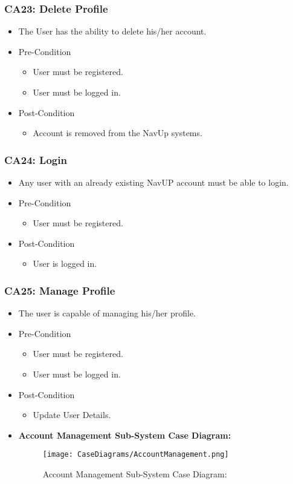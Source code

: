 \documentclass[12pt,a4paper]{article}
\begin{document}
		\subsubsection{CA23: Delete Profile}
			\begin{itemize}
				\item The User has the ability to delete his/her account.
					\item Pre-Condition
						\begin{itemize}
							\item User must be registered.
							\item User must be logged in.
						\end{itemize}
					\item Post-Condition
						\begin{itemize}
							\item Account is removed from the NavUp systems.
						\end{itemize}
			\end{itemize}
		\subsubsection{CA24: Login}
			\begin{itemize}
				\item Any user with an already existing NavUP account must be able to login.
					\item Pre-Condition
						\begin{itemize}
							\item User must be registered.
						\end{itemize}
					\item Post-Condition
						\begin{itemize}
							\item User is logged in.
						\end{itemize}
			\end{itemize}
		\subsubsection{CA25: Manage Profile}
			\begin{itemize}
				\item The user is capable of managing his/her profile.
					\item Pre-Condition
						\begin{itemize}
							\item User must be registered.
							\item User must be logged in.
						\end{itemize}
					\item Post-Condition
						\begin{itemize}
							\item Update User Details.
						\end{itemize}
				\item \textbf{Account Management Sub-System Case Diagram:}
				\begin{figure}[H]
					\texttt{[image: CaseDiagrams/AccountManagement.png]}
					\caption{Account Management Sub-System Case Diagram:}
				\end{figure}
			\end{itemize}
\end{document}
